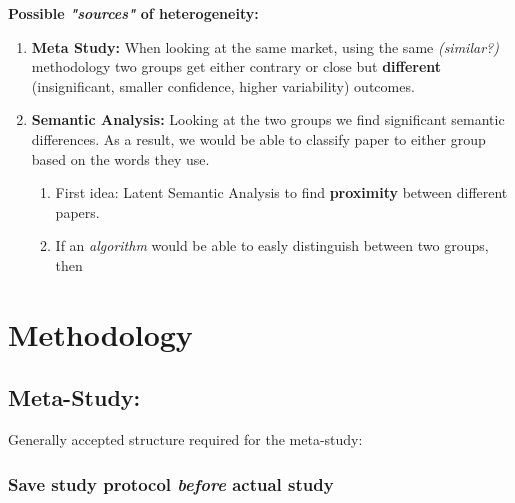 \documentclass{article}
\begin{document}
\newline \noindent
\textbf{Possible \textit{"sources"} of heterogeneity:}
\begin{enumerate}
    \item \textbf{Meta Study:} When looking at the same market, using the same \textit{(similar?)} methodology two groups get either contrary or close but \textbf{different} (insignificant, smaller confidence, higher variability) outcomes.
    \item \textbf{Semantic Analysis:} Looking at the two groups we find significant semantic differences. As a result, we would be able to classify paper to either group based on the words they use.
        \begin{enumerate}
            \item First idea: Latent Semantic Analysis to find \textbf{proximity} between different papers.
             \item If an \textit{algorithm} would be able to easly distinguish between two groups, then
        \end{enumerate}
\end{enumerate}


\newpage

\section{Methodology}

\subsection{Meta-Study:}
Generally accepted structure required for the meta-study:

\subsubsection{Save study protocol \textit{before} actual study}
\end{document}
